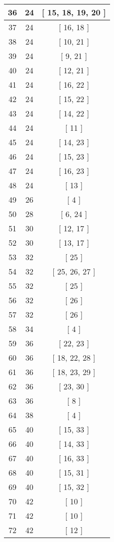 \begin{center}
\begin{longtable}[H]{|| c c c ||}
\hline
36 & 24 & [ 15, 18, 19, 20 ] \\ 
\hline
37 & 24 & [ 16, 18 ] \\ 
\hline
38 & 24 & [ 10, 21 ] \\ 
\hline
39 & 24 & [ 9, 21 ] \\ 
\hline
40 & 24 & [ 12, 21 ] \\ 
\hline
41 & 24 & [ 16, 22 ] \\ 
\hline
42 & 24 & [ 15, 22 ] \\ 
\hline
43 & 24 & [ 14, 22 ] \\ 
\hline
44 & 24 & [ 11 ] \\ 
\hline
45 & 24 & [ 14, 23 ] \\ 
\hline
46 & 24 & [ 15, 23 ] \\ 
\hline
47 & 24 & [ 16, 23 ] \\ 
\hline
48 & 24 & [ 13 ] \\ 
\hline
49 & 26 & [ 4 ] \\ 
\hline
50 & 28 & [ 6, 24 ] \\ 
\hline
51 & 30 & [ 12, 17 ] \\ 
\hline
52 & 30 & [ 13, 17 ] \\ 
\hline
53 & 32 & [ 25 ] \\ 
\hline
54 & 32 & [ 25, 26, 27 ] \\ 
\hline
55 & 32 & [ 25 ] \\ 
\hline
56 & 32 & [ 26 ] \\ 
\hline
57 & 32 & [ 26 ] \\ 
\hline
58 & 34 & [ 4 ] \\ 
\hline
59 & 36 & [ 22, 23 ] \\ 
\hline
60 & 36 & [ 18, 22, 28 ] \\ 
\hline
61 & 36 & [ 18, 23, 29 ] \\ 
\hline
62 & 36 & [ 23, 30 ] \\ 
\hline
63 & 36 & [ 8 ] \\ 
\hline
64 & 38 & [ 4 ] \\ 
\hline
65 & 40 & [ 15, 33 ] \\ 
\hline
66 & 40 & [ 14, 33 ] \\ 
\hline
67 & 40 & [ 16, 33 ] \\ 
\hline
68 & 40 & [ 15, 31 ] \\ 
\hline
69 & 40 & [ 15, 32 ] \\ 
\hline
70 & 42 & [ 10 ] \\ 
\hline
71 & 42 & [ 10 ] \\ 
\hline
72 & 42 & [ 12 ] \\ 

\end{longtable}
\end{center}
